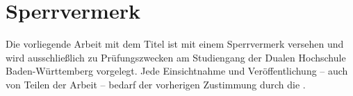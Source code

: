 
\thispagestyle{empty}
\section*{Sperrvermerk}

\vspace*{2em}

Die vorliegende Arbeit mit dem Titel {\itshape \titel} ist mit einem Sperrvermerk versehen und wird ausschließlich zu Prüfungszwecken am Studiengang {\studiengang} der Dualen Hochschule Baden-Württemberg {\abgabeort} vorgelegt.
Jede Einsichtnahme und Veröffentlichung – auch von Teilen der Arbeit – bedarf der vorherigen Zustimmung durch die {\firma}.
